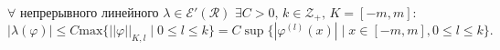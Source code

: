 \begin{to_thr}
	$\forall$ непрерывного линейного $\lambda \in \mathcal{E}'(\mathcal{R})$ $\exists C>0, \, k \in \mathcal{Z}_+,\, K= [-m,m]:$
	\begin{equation*}
		|\lambda(\varphi)| \leq C \text{max} \{||\varphi||_{K,l} \mid 0\leq l \leq k\} = C \sup \{|\varphi^{(l)}(x)| \mid x \in [-m,m], 0 \leq l \leq k\}.
	\end{equation*}
\end{to_thr}